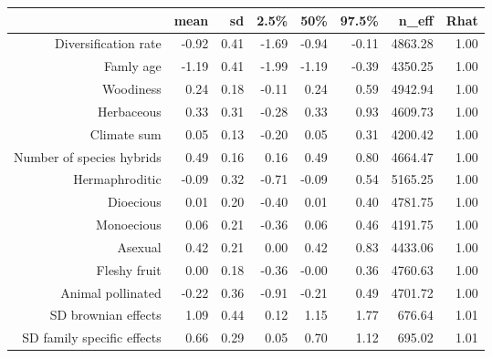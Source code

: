 \begin{table}[ht]
\centering
\begin{tabular}{rrrrrrrr}
  \hline
 & mean & sd & 2.5\% & 50\% & 97.5\% & n\_eff & Rhat \\ 
  \hline
Diversification rate & -0.92 & 0.41 & -1.69 & -0.94 & -0.11 & 4863.28 & 1.00 \\ 
  Famly age & -1.19 & 0.41 & -1.99 & -1.19 & -0.39 & 4350.25 & 1.00 \\ 
  Woodiness & 0.24 & 0.18 & -0.11 & 0.24 & 0.59 & 4942.94 & 1.00 \\ 
  Herbaceous & 0.33 & 0.31 & -0.28 & 0.33 & 0.93 & 4609.73 & 1.00 \\ 
  Climate sum & 0.05 & 0.13 & -0.20 & 0.05 & 0.31 & 4200.42 & 1.00 \\ 
  Number of species hybrids & 0.49 & 0.16 & 0.16 & 0.49 & 0.80 & 4664.47 & 1.00 \\ 
  Hermaphroditic & -0.09 & 0.32 & -0.71 & -0.09 & 0.54 & 5165.25 & 1.00 \\ 
  Dioecious & 0.01 & 0.20 & -0.40 & 0.01 & 0.40 & 4781.75 & 1.00 \\ 
  Monoecious & 0.06 & 0.21 & -0.36 & 0.06 & 0.46 & 4191.75 & 1.00 \\ 
  Asexual & 0.42 & 0.21 & 0.00 & 0.42 & 0.83 & 4433.06 & 1.00 \\ 
  Fleshy fruit & 0.00 & 0.18 & -0.36 & -0.00 & 0.36 & 4760.63 & 1.00 \\ 
  Animal pollinated & -0.22 & 0.36 & -0.91 & -0.21 & 0.49 & 4701.72 & 1.00 \\ 
  SD brownian effects & 1.09 & 0.44 & 0.12 & 1.15 & 1.77 & 676.64 & 1.01 \\ 
  SD family specific effects & 0.66 & 0.29 & 0.05 & 0.70 & 1.12 & 695.02 & 1.01 \\ 
   \hline
\end{tabular}
\end{table}
